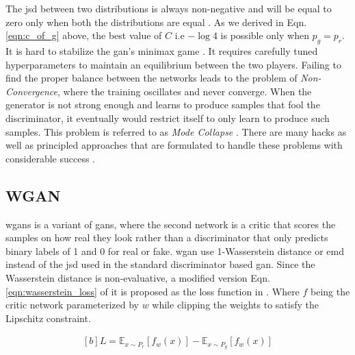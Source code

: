 The \ac{jsd} between two distributions is always non-negative and will be equal to zero only when both the distributions are equal \cite{js_divergence}. As we derived in Eqn. \ref{eqn:c_of_g} above, the best value of $C$ i.e $-\log 4$ is possible only when $p_{g}=p_{r}$. It is hard to stabilize the \ac{gan}'s minimax game \cite{martin2017principled}. It requires carefully tuned hyperparameters to maintain an equilibrium between the two players. Failing to find the proper balance between the networks leads to the problem of \textit{Non-Convergence}, where the training oscillates and never converge. When the generator is not strong enough and learns to produce samples that fool the discriminator, it eventually would restrict itself to only learn to produce such samples. This problem is referred to as \textit{Mode Collapse} \cite{commonganprobs}. There are many hacks as well as principled approaches that are formulated to handle these problems with considerable success \cite{openaigan2wgan}.

\subsection{WGAN}
\acp{wgan} is a variant of \acp{gan}, where the second network is a critic that scores the samples on how real they look rather than a discriminator that only predicts binary labels of 1 and 0 for real or fake. \ac{wgan} use 1-Wasserstein distance \cite{wasserstein_metric_2020} or \ac{emd} instead of the \ac{jsd} used in the standard discriminator based \ac{gan}. Since the Wasserstein distance is non-evaluative, a modified version Eqn. \ref{eqn:wasserstein_loss} of it is proposed as the loss function in \cite{soumith2017wasserstein}. Where $f$ being the critic network parameterized by $w$ while clipping the weights to satisfy the Lipschitz constraint.

\begin{equation} \label{eqn:wasserstein_loss}
    \begin{aligned}[b]
        L=\mathbb{E}_{x \sim P_{r}}\left[f_{w}(x)\right]-\mathbb{E}_{x \sim P_{g}}\left[f_{w}(x)\right]
    \end{aligned}
\end{equation}



